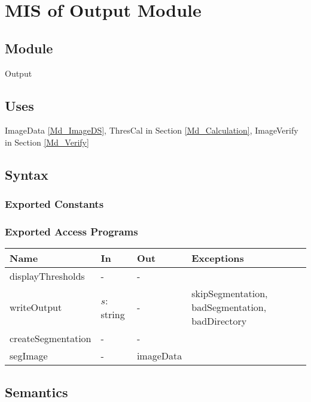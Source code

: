 \documentclass[12pt, titlepage]{article}
\begin{document}
\newpage

\section{MIS of Output Module} \label{Md_Output}

\subsection{Module}

Output

\subsection{Uses}

ImageData \ref{Md_ImageDS},
ThresCal in Section \ref{Md_Calculation}, ImageVerify in Section
\ref{Md_Verify}

\subsection{Syntax}

\subsubsection{Exported Constants}

\subsubsection{Exported Access Programs}

\begin{center}
\begin{tabular}{p{4cm} p{2cm} p{2cm} p{6cm}}
\hline
\textbf{Name} & \textbf{In} & \textbf{Out} & \textbf{Exceptions} \\
\hline
displayThresholds & - & - &\\
writeOutput & $s$: string & - &
skipSegmentation, badSegmentation, badDirectory \\
createSegmentation & - & - &\\
segImage & - & imageData &  \\
\hline
\end{tabular}
\end{center}

\subsection{Semantics}
\end{document}
